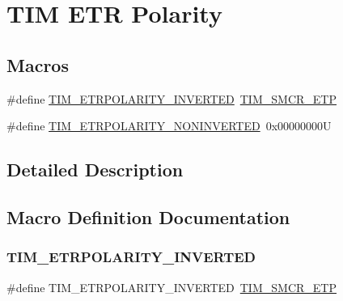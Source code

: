 \hypertarget{group___t_i_m___e_t_r___polarity}{}\section{T\+IM E\+TR Polarity}
\label{group___t_i_m___e_t_r___polarity}
\subsection*{Macros}
\begin{DoxyCompactItemize}
\item 
\#define \hyperlink{group___t_i_m___e_t_r___polarity_ga42652ff688f0042659f8304ae08abfa6}{T\+I\+M\+\_\+\+E\+T\+R\+P\+O\+L\+A\+R\+I\+T\+Y\+\_\+\+I\+N\+V\+E\+R\+T\+ED}~\hyperlink{group___peripheral___registers___bits___definition_ga2a5f335c3d7a4f82d1e91dc1511e3322}{T\+I\+M\+\_\+\+S\+M\+C\+R\+\_\+\+E\+TP}
\item 
\#define \hyperlink{group___t_i_m___e_t_r___polarity_ga7fa7c43245b25564414b2e191d5d8b14}{T\+I\+M\+\_\+\+E\+T\+R\+P\+O\+L\+A\+R\+I\+T\+Y\+\_\+\+N\+O\+N\+I\+N\+V\+E\+R\+T\+ED}~0x00000000U
\end{DoxyCompactItemize}


\subsection{Detailed Description}


\subsection{Macro Definition Documentation}
\mbox{\label{group___t_i_m___e_t_r___polarity_ga42652ff688f0042659f8304ae08abfa6}} 
\subsubsection{\texorpdfstring{T\+I\+M\+\_\+\+E\+T\+R\+P\+O\+L\+A\+R\+I\+T\+Y\+\_\+\+I\+N\+V\+E\+R\+T\+ED}{TIM\_ETRPOLARITY\_INVERTED}}
{\footnotesize\ttfamily \#define T\+I\+M\+\_\+\+E\+T\+R\+P\+O\+L\+A\+R\+I\+T\+Y\+\_\+\+I\+N\+V\+E\+R\+T\+ED~\hyperlink{group___peripheral___registers___bits___definition_ga2a5f335c3d7a4f82d1e91dc1511e3322}{T\+I\+M\+\_\+\+S\+M\+C\+R\+\_\+\+E\+TP}}

